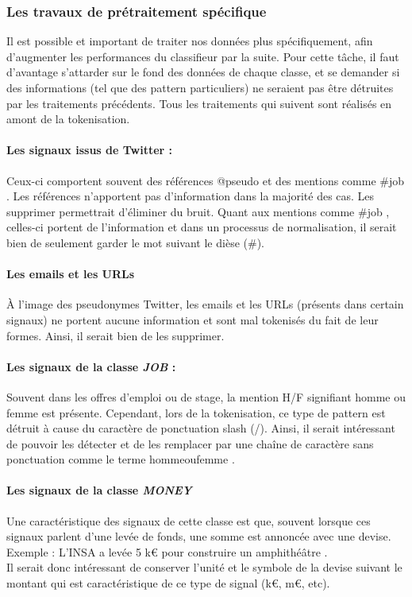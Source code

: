             \subsubsection{Les travaux de prétraitement spécifique}
                Il est possible et important de traiter nos données plus spécifiquement, afin d'augmenter les performances du classifieur par la suite. Pour cette tâche, il faut d'avantage s'attarder sur le fond des données de chaque classe, et se demander si des informations (tel que des pattern particuliers) ne seraient pas être détruites par les traitements précédents. Tous les traitements qui suivent sont réalisés en amont de la tokenisation.

                \paragraph{Les signaux issus de Twitter :}
                    Ceux-ci comportent souvent des références \og @pseudo \fg et des mentions comme \og \#job \fg. Les références n'apportent pas d'information dans la majorité des cas. Les supprimer permettrait d’éliminer du bruit. Quant aux mentions comme \og \#job \fg, celles-ci portent de l'information et dans un processus de normalisation, il serait bien de seulement garder le mot suivant le dièse (\#).

                \paragraph{Les emails et les URLs}
                    À l'image des pseudonymes Twitter, les emails et les URLs (présents dans certain signaux) ne portent aucune information et sont mal tokenisés du fait de leur formes. Ainsi, il serait bien de les supprimer.

                \paragraph{Les signaux de la classe \textit {JOB} :}
                    Souvent dans les offres d'emploi ou de stage, la mention \og H/F \fg signifiant \og homme ou femme \fg est présente. Cependant, lors de la tokenisation, ce type de pattern est détruit à cause du caractère de ponctuation slash (/). Ainsi, il serait intéressant de pouvoir les détecter et de les remplacer par une chaîne de caractère sans ponctuation comme le terme \og hommeoufemme \fg.

                \paragraph{Les signaux de la classe \textit{MONEY}}
                    Une caractéristique des signaux de cette classe est que, souvent lorsque ces signaux parlent d'une levée de fonds, une somme est annoncée avec une devise. Exemple : \og L'INSA a levée 5 k€ pour construire un amphithéâtre \fg.\\
                    Il serait donc intéressant de conserver l'unité et le symbole de la devise suivant le montant qui est caractéristique de ce type de signal (k€, m€, etc).

